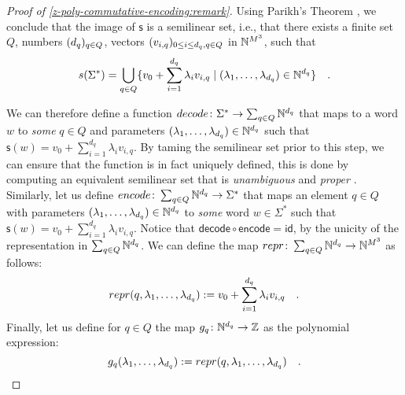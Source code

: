 \begin{proof}[Proof of \cref{z-poly-commutative-encoding:remark}]
    Using Parikh's Theorem \cite{PARI66},
    we conclude that the image of $\mathsf{s}$ is a semilinear set,
    i.e., that there exists a finite set $Q$,
    numbers $(d_q)_{q \in Q}$,
    vectors $(v_{i,q})_{0 \leq i \leq d_q, q \in Q}$ in $\mathbb{N}^{M^3}$,
    such that
    \begin{equation*}
        \mathsf{s}(\Sigma^*) =
        \bigcup_{q \in Q}
        \setof{
            v_0 + \sum_{i = 1}^{d_q} \lambda_i v_{i,q}
        }{
            (\lambda_1, \dots, \lambda_{d_q}) \in \Nat^{d_q}
        } \quad .
    \end{equation*}

    We can therefore define a function $\mathsf{decode} \colon \Sigma^* \to
    \sum_{q \in Q} \Nat^{d_q}$ that maps to a word $w$ to \emph{some} $q \in Q$
    and parameters $(\lambda_1, \dots, \lambda_{d_q}) \in \mathbb{N}^{d_q}$ such that
    $\mathsf{s}(w) = v_0 + \sum_{i = 1}^{d_q} \lambda_i v_{i,q}$. By taming the
    semilinear set prior to this step, we can ensure that the function is in
    fact uniquely defined, this is done by computing an equivalent semilinear
    set that is \emph{unambiguous} and \emph{proper} \cite{CHHA16}.
    Similarly, let us define $\mathsf{encode} \colon \sum_{q \in Q} \Nat^{d_q}
    \to \Sigma^*$ that maps an element $q \in Q$ with parameters $(\lambda_1,
    \dots, \lambda_{d_q}) \in \mathbb{N}^{d_q}$ to \emph{some} word $w \in \Sigma^*$
    such that $\mathsf{s}(w) = v_0 + \sum_{i = 1}^{d_q} \lambda_i v_{i,q}$.
    Notice that $\mathsf{decode} \circ \mathsf{encode} = \mathsf{id}$, by the
    unicity of the representation in $\sum_{q \in Q} \mathbb{N}^{d_q}$.
    We can define the map $\mathsf{repr} \colon \sum_{q \in Q} \Nat^{d_q} \to \Nat^{M^3}$
    as follows:
    \begin{equation*}
        \mathsf{repr}(q, \lambda_1, \dots, \lambda_{d_q}) \defined
        v_0 + \sum_{i = 1}^{d_q} \lambda_i v_{i,q}
        \quad .
    \end{equation*}
    Finally, let us define for $q \in Q$ the map $g_q \colon \mathbb{N}^{d_q} \to \mathbb{Z}$ as the polynomial
    expression:
    \begin{equation*}
        g_q(\lambda_1, \dots, \lambda_{d_q}) \defined \mathsf{repr}(q, \lambda_1, \dots, \lambda_{d_q}) \quad .
    \end{equation*}


\end{proof}
